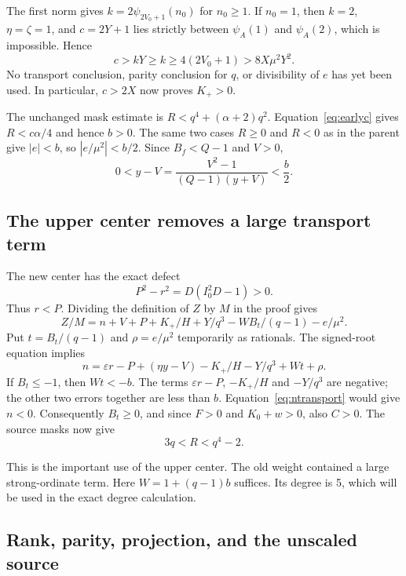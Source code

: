 \documentclass[11pt]{article}
\theoremstyle{remark}\newtheorem{remark}[theorem]{Remark}
\begin{document}
The first norm gives
$k=2\psi_{2V_0+1}(n_0)$ for $n_0\ge1$. If $n_0=1$, then $k=2$,
$\eta=\zeta=1$, and $c=2Y+1$ lies strictly between $\psi_A(1)$ and
$\psi_A(2)$, which is impossible. Hence
\begin{equation}\label{eq:earlyc}
c>kY\ge k\ge4(2V_0+1)>8X\mu^2Y^2.
\end{equation}
No transport conclusion, parity conclusion for $q$, or divisibility of $e$
has yet been used. In particular, $c>2X$ now proves $K_+>0$.

The unchanged mask estimate is
$R<q^4+(\alpha+2)q^2$. Equation~\eqref{eq:earlyc} gives
$R<c\alpha/4$ and hence $b>0$. The same two cases $R\ge0$ and $R<0$
as in the parent give $|e|<b$, so $|e/\mu^2|<b/2$.
Since $B_f<Q-1$ and $V>0$,
\[
0<y-V=\frac{V^2-1}{(Q-1)(y+V)}<\frac b2.
\]

\subsection{The upper center removes a large transport term}

The new center has the exact defect
\begin{equation}\label{eq:defect}
P^2-r^2=D(I_0^2D-1)>0.
\end{equation}
Thus $r<P$. Dividing the definition of $Z$ by $M$ in the proof gives
\[
Z/M=n+V+P+K_+/H+Y/q^3-WB_t/(q-1)-e/\mu^2.
\]
Put $t=B_t/(q-1)$ and $\rho=e/\mu^2$ temporarily as rationals. The
signed-root equation implies
\begin{equation}\label{eq:ntransport}
n=\varepsilon r-P+(\eta y-V)-K_+/H-Y/q^3+Wt+\rho.
\end{equation}
If $B_t\le-1$, then $Wt<-b$. The terms $\varepsilon r-P$,
$-K_+/H$ and $-Y/q^3$ are negative; the other two errors together are
less than $b$. Equation~\eqref{eq:ntransport} would give $n<0$.
Consequently $B_t\ge0$, and since $F>0$ and $K_0+w>0$, also $C>0$.
The source masks now give
\begin{equation}\label{eq:Rbounds}
3q<R<q^4-2.
\end{equation}

This is the important use of the upper center. The old weight contained
a large strong-ordinate term. Here $W=1+(q-1)b$ suffices. Its degree is 5,
which will be used in the exact degree calculation.

\subsection{Rank, parity, projection, and the unscaled source}
\end{document}
